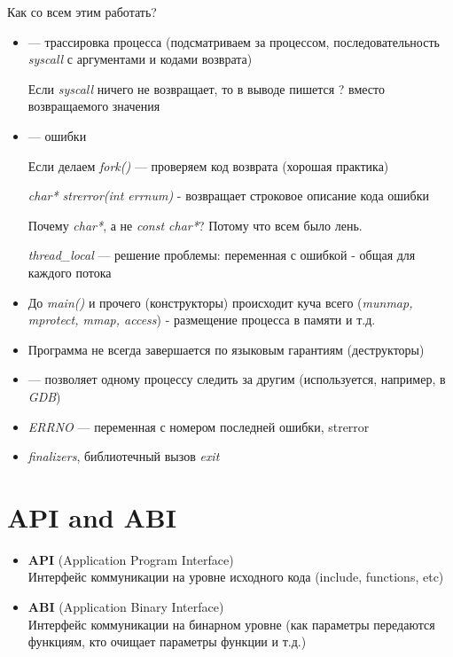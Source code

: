 \documentclass[../../lectures.tex]{subfiles}
\begin{document}
\newpage
Как со всем этим работать?
\begin{itemize}
    \item {} --- трассировка процесса (подсматриваем за процессом, 
          последовательность \emph{syscall} с аргументами и кодами возврата)

    Если \emph{syscall} ничего не возвращает, то в выводе пишется ? вместо возвращаемого значения

    \item {} --- ошибки

    Если делаем \emph{fork()} --- проверяем код возврата (хорошая практика)

    \emph{char* strerror(int errnum)} - возвращает строковое описание кода ошибки

    Почему \emph{char*}, а не \emph{const char*}? Потому что всем было лень.

    \emph{thread\_local} --- решение проблемы: переменная с ошибкой - общая для каждого потока

    \item До \emph{main()} и прочего (конструкторы) происходит куча всего 
          (\emph{munmap, mprotect, mmap, access}) - размещение процесса в памяти и т.д.

    \item Программа не всегда завершается по языковым гарантиям (деструкторы)

    \item {} --- позволяет одному процессу следить за другим (используется, например, в \emph{GDB})

    \item \emph{ERRNO} --- переменная с номером последней ошибки, strerror

    \item \emph{finalizers}, библиотечный вызов \emph{exit}
\end{itemize}

\section{API and ABI}
\begin{itemize}
    \item \textbf{API} (Application Program Interface)\\
          Интерфейс коммуникации на уровне исходного кода
          (include, functions, etc)
    \item \textbf{ABI} (Application Binary Interface)\\
          Интерфейс коммуникации на бинарном уровне
          (как параметры передаются функциям, кто очищает
          параметры функции и т.д.)
\end{itemize}
\end{document}
